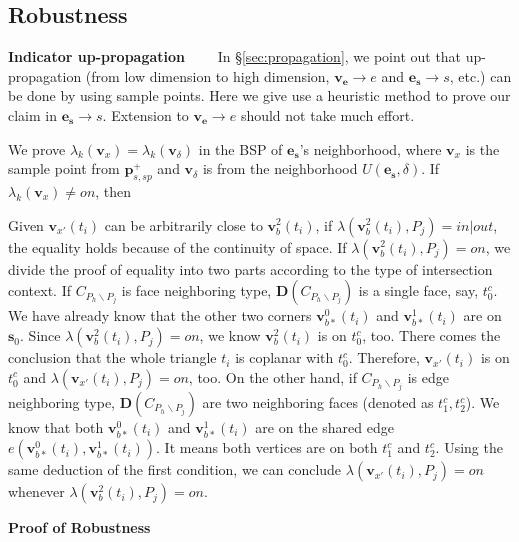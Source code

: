 \documentclass[10pt,journal,compsoc]{IEEEtran}
\begin{document}
\iffalse

\subsection{Robustness}

\vspace{0.5em}
\noindent\textbf{Indicator up-propagation}~~~~
In \S\ref{sec:propagation}, we point out that up-propagation (from low dimension to high dimension, $\bm{v}_{\bm{e}}\to e$ and $\bm{e}_{\bm{s}}\to s$, etc.) can be done by using sample points. Here we give use a heuristic method to prove our claim in $\bm{e}_{\bm{s}}\to s$. Extension to $\bm{v}_{\bm{e}}\to e$ should not take much effort.

\vspace{0.5em}\noindent We prove $\lambda_k(\bm{v}_x)=\lambda_k(\bm{v}_{\delta})$ in the BSP of $\bm{e}_{\bm{s}}$'s neighborhood, where $ \bm{v}_x$ is the sample point from $\bm{p}_{s, sp}^+$ and $\bm{v}_{\delta}$ is from the neighborhood $U(\bm{e}_{\bm{s}}, \delta)$. If $\lambda_k(\bm{v}_x) \neq on$, then

Given $\bm{v}_{x'}(t_i)$ can be arbitrarily close to $\bm{v}_b^2(t_i)$, if $\lambda(\bm{v}_b^2(t_i), P_j) = in | out$, the equality holds because of the continuity of space. If $\lambda(\bm{v}_b^2(t_i), P_j) = on$, we divide the proof of equality into two parts according to the type of intersection context. If $C_{P_h \backslash P_j}$ is face neighboring type, $\boldsymbol{D}(C_{P_h \backslash P_j})$ is a single face, say, $t_0^c$. We have already know that the other two corners $\bm{v}_{b*}^{0}(t_i)$ and $\bm{v}_{b*}^{1}(t_i)$ are on $\bm{s}_0$. Since $\lambda(\bm{v}_b^2(t_i), P_j) = on$, we know $\bm{v}_b^2(t_i)$ is on $t_0^c$, too. There comes the conclusion that the whole triangle $t_i$ is coplanar with $t_0^c$. Therefore, $\bm{v}_{x'}(t_i)$ is on $t_0^c$ and $\lambda(\bm{v}_{x'}(t_i), P_j) = on$, too. On the other hand, if $C_{P_h \backslash P_j}$ is edge neighboring type, $\boldsymbol{D}(C_{P_h \backslash P_j})$ are two neighboring faces (denoted as $t_1^c, t_2^c$). We know that both $\bm{v}_{b*}^{0}(t_i)$ and $\bm{v}_{b*}^{1}(t_i)$ are on the shared edge $e(\bm{v}_{b*}^{0}(t_i), \bm{v}_{b*}^{1}(t_i))$. It means both vertices are on both $t_1^c$ and $t_2^c$. Using the same deduction of the first condition, we can conclude $\lambda(\bm{v}_{x'}(t_i), P_j) = on$ whenever $\lambda(\bm{v}_b^2(t_i), P_j) = on$.

\vspace{0.5em}
\noindent\textbf{Proof of Robustness}
\end{document}
